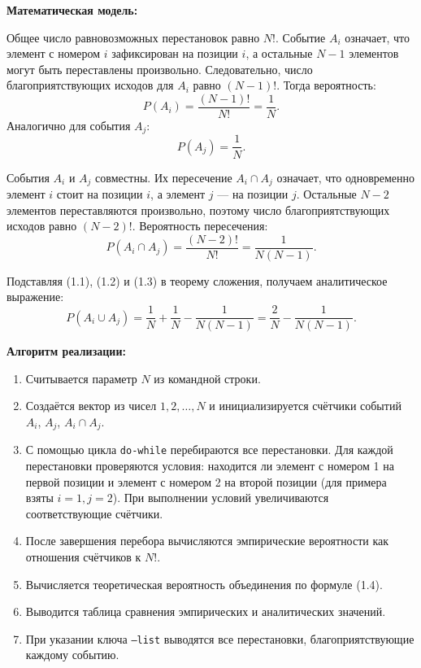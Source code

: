 \documentclass[a4paper]{article}
\theoremstyle{definition}
\begin{document}
\textbf{Математическая модель:}

Общее число равновозможных перестановок равно $N!$. Событие $A_i$ означает, что элемент с номером $i$ зафиксирован на позиции $i$, а остальные $N-1$ элементов могут быть переставлены произвольно. Следовательно, число благоприятствующих исходов для $A_i$ равно $(N-1)!$. Тогда вероятность:
\begin{equation}
    P(A_i) = \frac{(N-1)!}{N!} = \frac{1}{N}. \tag{1.1}
\end{equation}
Аналогично для события $A_j$:
\begin{equation}
    P(A_j) = \frac{1}{N}. \tag{1.2}
\end{equation}

События $A_i$ и $A_j$ совместны. Их пересечение $A_i \cap A_j$ означает, что одновременно элемент $i$ стоит на позиции $i$, а элемент $j$ — на позиции $j$. Остальные $N-2$ элементов переставляются произвольно, поэтому число благоприятствующих исходов равно $(N-2)!$. Вероятность пересечения:
\begin{equation}
    P(A_i \cap A_j) = \frac{(N-2)!}{N!} = \frac{1}{N(N-1)}. \tag{1.3}
\end{equation}

Подставляя (1.1), (1.2) и (1.3) в теорему сложения, получаем аналитическое выражение:
\begin{equation}
    P(A_i \cup A_j) = \frac{1}{N} + \frac{1}{N} - \frac{1}{N(N-1)} = \frac{2}{N} - \frac{1}{N(N-1)}. \tag{1.4}
\end{equation}

\textbf{Алгоритм реализации:}

\begin{enumerate}
    \item Считывается параметр $N$ из командной строки.
    \item Создаётся вектор из чисел $1,2,\dots,N$ и инициализируется счётчики событий $A_i$, $A_j$, $A_i \cap A_j$.
    \item С помощью цикла \texttt{do-while} перебираются все перестановки. Для каждой перестановки проверяются условия: находится ли элемент с номером 1 на первой позиции и элемент с номером 2 на второй позиции (для примера взяты $i=1, j=2$). При выполнении условий увеличиваются соответствующие счётчики.
    \item После завершения перебора вычисляются эмпирические вероятности как отношения счётчиков к $N!$.
    \item Вычисляется теоретическая вероятность объединения по формуле (1.4).
    \item Выводится таблица сравнения эмпирических и аналитических значений.
    \item При указании ключа \texttt{--list} выводятся все перестановки, благоприятствующие каждому событию.
\end{enumerate}
\end{document}
